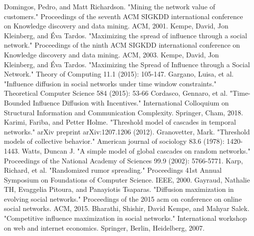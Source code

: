 \documentclass[twocolumn, 10pt]{article}
\begin{document}
\begin{thebibliography}{1}

 Domingos, Pedro, and Matt Richardson. "Mining the network value of customers." Proceedings of the seventh ACM SIGKDD international conference on Knowledge discovery and data mining. ACM, 2001.
 Kempe, David, Jon Kleinberg, and Éva Tardos. "Maximizing the spread of influence through a social network." Proceedings of the ninth ACM SIGKDD international conference on Knowledge discovery and data mining. ACM, 2003.
 Kempe, David, Jon Kleinberg, and Éva Tardos. "Maximizing the Spread of Influence through a Social Network." Theory of Computing 11.1 (2015): 105-147.
 Gargano, Luisa, et al. "Influence diffusion in social networks under time window constraints." Theoretical Computer Science 584 (2015): 53-66
 Cordasco, Gennaro, et al. "Time-Bounded Influence Diffusion with Incentives." International Colloquium on Structural Information and Communication Complexity. Springer, Cham, 2018.
 Karimi, Fariba, and Petter Holme. "Threshold model of cascades in temporal networks." arXiv preprint arXiv:1207.1206 (2012).
 Granovetter, Mark. "Threshold models of collective behavior." American journal of sociology 83.6 (1978): 1420-1443.
 Watts, Duncan J. "A simple model of global cascades on random networks." Proceedings of the National Academy of Sciences 99.9 (2002): 5766-5771.
 Karp, Richard, et al. "Randomized rumor spreading." Proceedings 41st Annual Symposium on Foundations of Computer Science. IEEE, 2000.
 Gayraud, Nathalie TH, Evaggelia Pitoura, and Panayiotis Tsaparas. "Diffusion maximization in evolving social networks." Proceedings of the 2015 acm on conference on online social networks. ACM, 2015.
 Bharathi, Shishir, David Kempe, and Mahyar Salek. "Competitive influence maximization in social networks." International workshop on web and internet economics. Springer, Berlin, Heidelberg, 2007.

\end{thebibliography}
\end{document}
